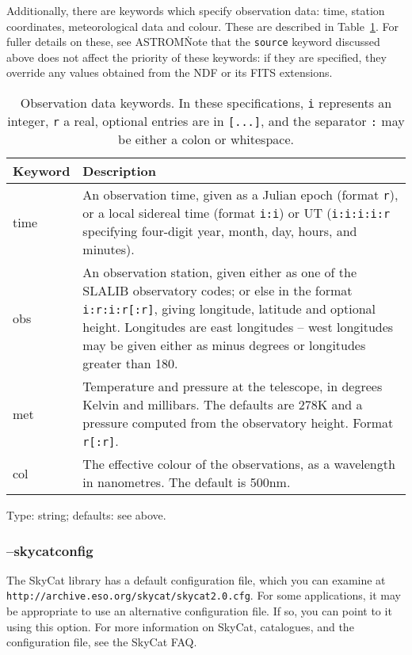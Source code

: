\documentclass[twoside,11pt]{article}
\newcommand{\htmladdnormallink}[2]{#1}
\newcommand{\xref}[3]{#1}
\newcommand{\xlabel}[1]{}
\newcommand{\ASTROMref}{\xref{{\footnotesize ASTROM}}{sun5}{}}
\newcommand{\SkyCatFAQ}{\htmladdnormallink{SkyCat FAQ}{http://archive.eso.org/skycat/skycat-faq.html}}
\begin{document}
Additionally, there are keywords which specify observation data: time, station
coordinates, meteorological data and colour.  These are described in
Table~\ref{tab:datetime}.  For fuller details on these, see \ASTROMref\.  Note
that the \texttt{source} keyword discussed above does not affect the priority
of these keywords: if they are specified, they override any values obtained
from the NDF or its FITS extensions.

\begin{table}
\begin{center}
\begin{tabular}{l|p{10cm}}
Keyword & Description \\ \hline
time & An observation time, given as a Julian epoch (format \texttt{r}), or a
local sidereal time (format \texttt{i:i}) or UT (\texttt{i:i:i:i:r} specifying
four-digit year, month, day, hours, and minutes). \\
obs & An observation station, given either as one of the SLALIB observatory
codes; or else in the format \texttt{i:r:i:r[:r]}, giving longitude, latitude
and optional height. Longitudes are east longitudes -- west longitudes may be
given either as minus degrees or longitudes greater than 180. \\
met & Temperature and pressure at the telescope, in degrees Kelvin and
millibars. The defaults are 278K and a pressure computed from the observatory
height. Format \texttt{r[:r]}. \\
col & The effective colour of the observations, as a wavelength in
nanometres. The default is 500nm.
\end{tabular}
\end{center}
\caption{\label{tab:datetime}Observation data keywords. In these
  specifications, \texttt{i} represents an integer, \texttt{r} a real,
  optional entries are in \texttt{[...]}, and the separator \texttt{:} may be
  either a colon or whitespace.}
\end{table}

Type: string; defaults: see above.

\subsubsection{\xlabel{sb_options_skycatconfig}--skycatconfig\label{sb:options:skycatconfig}}

The SkyCat library has a default configuration file, which you can examine at
\texttt{http://archive.eso.org/skycat/skycat2.0.cfg}.  For some applications,
it may be appropriate to use an alternative configuration file.  If so, you
can point to it using this option.  For more information on SkyCat,
catalogues, and the configuration file, see the \SkyCatFAQ.
\end{document}

